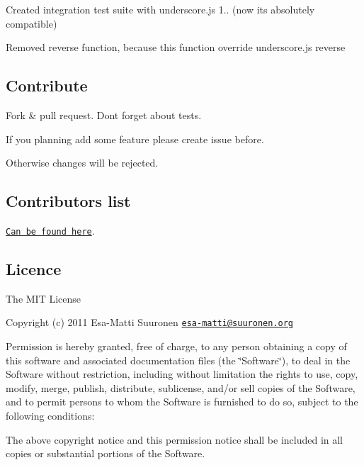 \begin{DoxyItemize}
\item Created integration test suite with underscore.\+js 1.. (now it\textquotesingle{}s absolutely compatible)
\item Removed \textquotesingle{}reverse\textquotesingle{} function, because this function override underscore.\+js \textquotesingle{}reverse\textquotesingle{}
\end{DoxyItemize}

\subsection*{Contribute}


\begin{DoxyItemize}
\item Fork \& pull request. Don\textquotesingle{}t forget about tests.
\item If you planning add some feature please create issue before.
\end{DoxyItemize}

Otherwise changes will be rejected.

\subsection*{Contributors list}

\href{https://github.com/epeli/underscore.string/graphs/contributors}{\tt Can be found here}.

\subsection*{Licence}

The M\+I\+T License

Copyright (c) 2011 Esa-\/\+Matti Suuronen \href{mailto:esa-matti@suuronen.org}{\tt esa-\/matti@suuronen.\+org}

Permission is hereby granted, free of charge, to any person obtaining a copy of this software and associated documentation files (the \char`\"{}\+Software\char`\"{}), to deal in the Software without restriction, including without limitation the rights to use, copy, modify, merge, publish, distribute, sublicense, and/or sell copies of the Software, and to permit persons to whom the Software is furnished to do so, subject to the following conditions\+:

The above copyright notice and this permission notice shall be included in all copies or substantial portions of the Software.


